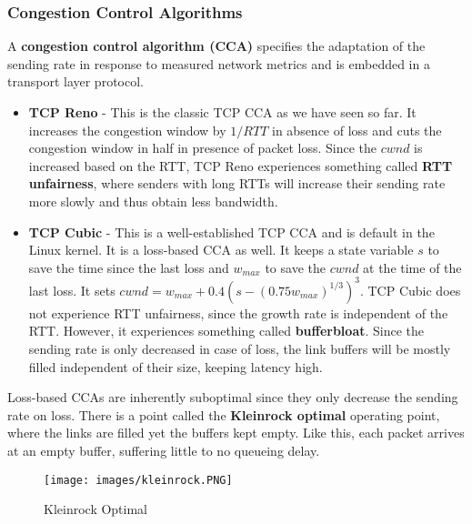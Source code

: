 \subsubsection{Congestion Control Algorithms}
A \textbf{congestion control algorithm (CCA)} specifies the adaptation of the sending rate in response to measured network metrics and is embedded in a transport layer protocol.
\begin{itemize}
\item \textbf{TCP Reno} - This is the classic TCP CCA as we have seen so far. It increases the congestion window by $1/RTT$ in absence of loss and cuts the congestion window in half in presence of packet loss. Since the $cwnd$ is increased based on the RTT, TCP Reno experiences something called \textbf{RTT unfairness}, where senders with long RTTs will increase their sending rate more slowly and thus obtain less bandwidth.
\item \textbf{TCP Cubic} - This is a well-established TCP CCA and is default in the Linux kernel. It is a loss-based CCA as well. It keeps a state variable $s$ to save the time since the last loss and $w_{max}$ to save the $cwnd$ at the time of the last loss. It sets $cwnd = w_{max} + 0.4(s - (0.75 w_{max})^{1/3})^3$. TCP Cubic does not experience RTT unfairness, since the growth rate is independent of the RTT. However, it experiences something called \textbf{bufferbloat}. Since the sending rate is only decreased in case of loss, the link buffers will be mostly filled independent of their size, keeping latency high.
\end{itemize}
Loss-based CCAs are inherently suboptimal since they only decrease the sending rate on loss. There is a point called the \textbf{Kleinrock optimal} operating point, where the links are filled yet the buffers kept empty. Like this, each packet arrives at an empty buffer, suffering little to no queueing delay.
\begin{figure}[H]
\centering
\texttt{[image: images/kleinrock.PNG]}
\caption{Kleinrock Optimal}
\label{kleinrock}
\end{figure}
